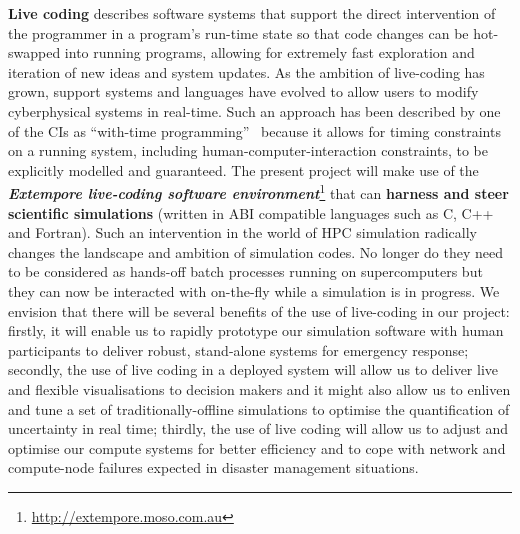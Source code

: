 \iffalse
When uncertainty is included into a model, the essential
dimensionality of the problem is increased markedly.  New and more
sophisticated techniques are then required to deal with the so called
`curse of dimensionality', where the cost of computation increases
exponentially with the dimension of the problem.  The mathematical
component of this project will be based on new developments combining
reduced order models (such as sparse grids and reduced basis methods)
with uncertainty quantification.  Sparse
grids~\parencite{BungartzGriebel2004} are known to reduce the effects
of the curse of dimensionality and recent work in our group has found
new ways to incorporate gradient information and multi-fidelity models
into sparse grid
approximations~\parencite{deBaarHarding2015,Jakeman2015,deBaarRDM2015}.
We will extend this work to construct efficient techniques for
incorporating uncertainty information into storm surge-tsunami models.
Reduced basis methods~\parencite{quarteroni2015reduced} provide an
alternative approach for constructing reduced order models and will
also be investigated.
\fi

{\bf Live coding} describes software systems that support the direct
intervention of the programmer in a program’s run-time state so that 
code changes can be 
hot-swapped into running programs, allowing for extremely fast
exploration and iteration of new ideas and system updates. As the
ambition of live-coding has grown, support systems and languages have
evolved to allow users to modify 
cyberphysical systems in real-time. Such an approach has been
described by one of the CIs as ``with-time
programming''~\parencite{sorensen2010programming} because it allows
for timing constraints on a running system, including
human-computer-interaction constraints, to be explicitly modelled and
guaranteed. The present project will make use of the {\em\bf Extempore
  live-coding software
  environment}\footnote{\url{http://extempore.moso.com.au}} that can
{\bf harness and steer scientific simulations} (written in ABI compatible
languages such as C, C++ and Fortran). Such an intervention in
the world of HPC simulation radically changes
the landscape and ambition of simulation codes. No longer do they need
to be considered as hands-off batch processes running on
supercomputers but they can now be interacted with on-the-fly while a
simulation is in progress. We envision that there will be several
benefits of the use of live-coding in our project: firstly, it
will enable us to {rapidly prototype our simulation software}  with human participants to
deliver robust, stand-alone systems for
 emergency response;  secondly, the use of live coding in a deployed system will allow us to deliver live and flexible visualisations 
 to decision makers and it might also allow us to 
{enliven and tune a set of traditionally-offline simulations to optimise the 
quantification of uncertainty in real time}; thirdly, the use of live coding
will allow us to {adjust and optimise our compute systems for better efficiency} and to cope 
with network and compute-node failures expected in disaster management situations.

